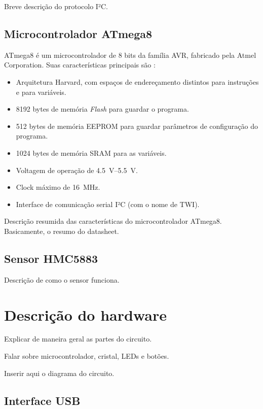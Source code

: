 \documentclass[brazil,pagestart=firstchapter]{abnt}
\begin{document}
Breve descrição do protocolo I²C.

\section{Microcontrolador ATmega8\label{sec:atmega8}}

ATmega8 é um microcontrolador de 8 bits da família AVR, fabricado pela Atmel
Corporation. Suas características principais são \cite{ATmega8}:

\begin{itemize}
\item Arquitetura Harvard, com espaços de endereçamento distintos para 
instruções e para variáveis.
\item \num{8192} bytes de memória \textit{Flash} para guardar o programa.
\item \num{512} bytes de memória EEPROM para guardar parâmetros de configuração do
programa.
\item \num{1024} bytes de memória SRAM para as variáveis.
\item Voltagem de operação de \SIrange{4.5}{5.5}{\volt}.
\item Clock máximo de \SI{16}{\mega\hertz}.
\item Interface de comunicação serial I²C (com o nome de TWI).
\end{itemize}

Descrição resumida das características do microcontrolador ATmega8.
Basicamente, o resumo do datasheet.

\section{Sensor HMC5883\label{sec:sensor}}

Descrição de como o sensor funciona.


\chapter{Descrição do hardware\label{cap:hardware}}

Explicar de maneira geral as partes do circuito.

Falar sobre microcontrolador, cristal, LEDs e botões.

Inserir aqui o diagrama do circuito.

\section{Interface USB\label{sec:hardware_usb}}
\end{document}

